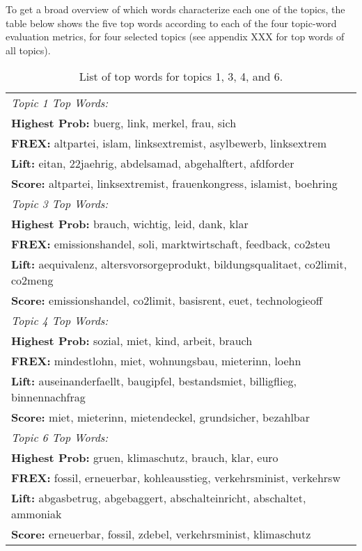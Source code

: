 \documentclass[12pt]{article}
\begin{document}
To get a broad overview of which words characterize each one of the topics, the table below shows the five top words according to each of the four topic-word evaluation metrics, for four selected topics (see appendix XXX for top words of all topics).

\begin{table}[h!]
\centering
\captionsetup{justification=centering,margin=2cm}
\begin{tabular}{|l|}
\hline
\textit{Topic 1 Top Words:}\\
 	 \textbf{Highest Prob:} buerg, link, merkel, frau, sich \\
 	 \textbf{FREX:} altpartei, islam, linksextremist, asylbewerb, linksextrem \\
 	 \textbf{Lift:} eitan, 22jaehrig, abdelsamad, abgehalftert, afdforder \\
 	 \textbf{Score:} altpartei, linksextremist, frauenkongress, islamist, boehring \\
\hline
\textit{Topic 3 Top Words:}\\
 	 \textbf{Highest Prob:} brauch, wichtig, leid, dank, klar \\
 	 \textbf{FREX:} emissionshandel, soli, marktwirtschaft, feedback, co2steu \\
 	 \textbf{Lift:} aequivalenz, altersvorsorgeprodukt, bildungsqualitaet, co2limit, co2meng \\
 	 \textbf{Score:} emissionshandel, co2limit, basisrent, euet, technologieoff \\
\hline
\textit{Topic 4 Top Words:}\\
 	 \textbf{Highest Prob:} sozial, miet, kind, arbeit, brauch \\
 	 \textbf{FREX:} mindestlohn, miet, wohnungsbau, mieterinn, loehn \\
 	 \textbf{Lift:} auseinanderfaellt, baugipfel, bestandsmiet, billigflieg, binnennachfrag \\
 	 \textbf{Score:} miet, mieterinn, mietendeckel, grundsicher, bezahlbar \\
\hline
\textit{Topic 6 Top Words:}\\
 	 \textbf{Highest Prob:} gruen, klimaschutz, brauch, klar, euro \\
 	 \textbf{FREX:} fossil, erneuerbar, kohleausstieg, verkehrsminist, verkehrsw \\
 	 \textbf{Lift:} abgasbetrug, abgebaggert, abschalteinricht, abschaltet, ammoniak \\ 
 	 \textbf{Score:} erneuerbar, fossil, zdebel, verkehrsminist, klimaschutz \\
\hline
\end{tabular}
\caption{List of top words for topics 1, 3, 4, and 6.}
\label{tab:top_words_1346}
\end{table}
\end{document}
